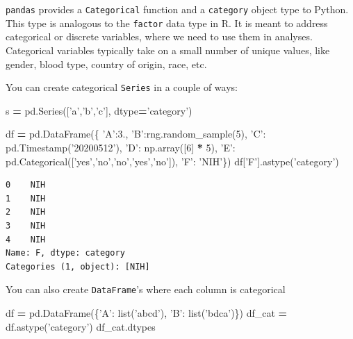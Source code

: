 \documentclass[
  letterpaper,
]{scrbook}
\newenvironment{Shaded}{\begin{snugshade}}{\end{snugshade}}
\newcommand{\BuiltInTok}[1]{#1}
\newcommand{\DecValTok}[1]{\textcolor[rgb]{0.00,0.00,0.81}{#1}}
\newcommand{\FloatTok}[1]{\textcolor[rgb]{0.00,0.00,0.81}{#1}}
\newcommand{\NormalTok}[1]{#1}
\newcommand{\OperatorTok}[1]{\textcolor[rgb]{0.81,0.36,0.00}{\textbf{#1}}}
\newcommand{\StringTok}[1]{\textcolor[rgb]{0.31,0.60,0.02}{#1}}
\begin{document}
\texttt{pandas} provides a \texttt{Categorical} function and a \texttt{category} object type to Python. This type is analogous to the \texttt{factor} data type in R. It is meant to address categorical or discrete variables, where we need to use them in analyses. Categorical variables typically take on a small number of unique values, like gender, blood type, country of origin, race, etc.

You can create categorical \texttt{Series} in a couple of ways:

\begin{Shaded}
\begin{Highlighting}[]
\NormalTok{s }\OperatorTok{=}\NormalTok{ pd.Series([}\StringTok{'a'}\NormalTok{,}\StringTok{'b'}\NormalTok{,}\StringTok{'c'}\NormalTok{], dtype}\OperatorTok{=}\StringTok{'category'}\NormalTok{)}
\end{Highlighting}
\end{Shaded}

\begin{Shaded}
\begin{Highlighting}[]
\NormalTok{df }\OperatorTok{=}\NormalTok{ pd.DataFrame(\{}
    \StringTok{'A'}\NormalTok{:}\FloatTok{3.}\NormalTok{,}
    \StringTok{'B'}\NormalTok{:rng.random_sample(}\DecValTok{5}\NormalTok{),}
    \StringTok{'C'}\NormalTok{: pd.Timestamp(}\StringTok{'20200512'}\NormalTok{),}
    \StringTok{'D'}\NormalTok{: np.array([}\DecValTok{6}\NormalTok{] }\OperatorTok{*} \DecValTok{5}\NormalTok{),}
    \StringTok{'E'}\NormalTok{: pd.Categorical([}\StringTok{'yes'}\NormalTok{,}\StringTok{'no'}\NormalTok{,}\StringTok{'no'}\NormalTok{,}\StringTok{'yes'}\NormalTok{,}\StringTok{'no'}\NormalTok{]),}
    \StringTok{'F'}\NormalTok{: }\StringTok{'NIH'}\NormalTok{\})}
\NormalTok{df[}\StringTok{'F'}\NormalTok{].astype(}\StringTok{'category'}\NormalTok{)}
\end{Highlighting}
\end{Shaded}

\begin{verbatim}
0    NIH
1    NIH
2    NIH
3    NIH
4    NIH
Name: F, dtype: category
Categories (1, object): [NIH]
\end{verbatim}

You can also create \texttt{DataFrame}'s where each column is categorical

\begin{Shaded}
\begin{Highlighting}[]
\NormalTok{df }\OperatorTok{=}\NormalTok{ pd.DataFrame(\{}\StringTok{'A'}\NormalTok{: }\BuiltInTok{list}\NormalTok{(}\StringTok{'abcd'}\NormalTok{), }\StringTok{'B'}\NormalTok{: }\BuiltInTok{list}\NormalTok{(}\StringTok{'bdca'}\NormalTok{)\})}
\NormalTok{df_cat }\OperatorTok{=}\NormalTok{ df.astype(}\StringTok{'category'}\NormalTok{)}
\NormalTok{df_cat.dtypes}
\end{Highlighting}
\end{Shaded}
\end{document}
